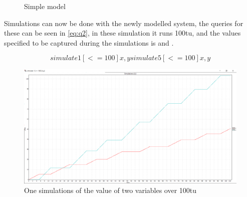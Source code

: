 \begin{figure}[H]
	\centering
	\caption{Simple model}
	\label{fig:showcase01}
\end{figure}

Simulations can now be done with the newly modelled system, the queries for these can be seen in \cref{eq:q2}, in these simulation it runs 100\gls{tu}, and the values specified to be captured during the simulations is  and .

\begin{equation}\label{eq:q2}
simulate 1 [<= 100] {x,y}
simulate 5 [<= 100] {x,y}
\end{equation}

\begin{figure}[!h]
	\includegraphics[width=\textwidth]{graphics/showcase01.png}
	\caption{One simulations of the value of two variables  over 100\gls{tu}}
	\label{fig:sim01}
\end{figure}

